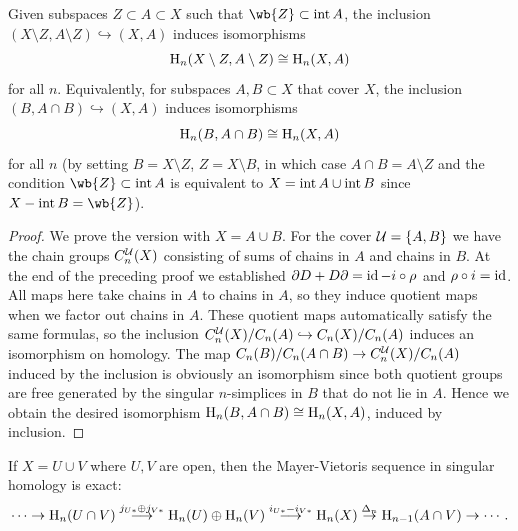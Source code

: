 \begin{thm}\label{thm excision homology}
    Given subspaces $Z\subset A\subset X$ such that $\wb{Z}\subset \Int A$, the inclusion $(X\setminus Z,A\setminus Z)\hookrightarrow (X,A)$ induces isomorphisms 
    \[\mathrm{H}_n(X\setminus Z,A\setminus Z)\cong \mathrm{H}_n(X,A)\]
    for all $n$. Equivalently, for subspaces $A,B\subset X$ that cover $X$, the inclusion $(B,A\cap B)\hookrightarrow (X,A)$ induces isomorphisms
    \[\mathrm{H}_n(B,A\cap B)\cong \mathrm{H}_n(X,A)\]
    for all $n$ (by setting $B=X\setminus Z$, $Z=X\setminus B$, in which case $A\cap B=A\setminus Z$ and the condition $\wb{Z}\subset \Int A$ is equivalent to $X=\operatorname{int} A\cup\operatorname{int} B$ since $X-\Int B=\wb{Z}$).
\end{thm}
\begin{proof}
     We prove the version with $X=A\cup B$. For the cover $\mathcal{U}=\{A,B\}$ we have the chain groups $C_n^{\mathcal{U}}(X)$ consisting of sums of chains in $A$ and chains in $B$. At the end of the preceding proof we established $\partial D+D\partial=\operatorname{id}-i\circ\rho$ and $\rho\circ i=\operatorname{id}$. All maps here take chains in $A$ to chains in $A$, so they induce  quotient maps when we factor out chains in $A$. These quotient maps automatically satisfy the same formulas, so the inclusion $C^{\mathcal{U}}_n(X)/C_n(A)\hookrightarrow C_n(X)/C_n(A)$ induces an isomorphism on homology. The map $C_n(B)/C_n(A\cap B)\to C_n^{\mathcal{U}}(X)/C_n(A)$ induced by the inclusion is obviously an isomorphism since both quotient groups are free generated by the singular $n$-simplices in $B$ that do not lie in $A$. Hence we obtain the desired isomorphism $\mathrm{H}_n(B,A\cap B)\cong \mathrm{H}_n(X,A)$, induced by inclusion.
\end{proof}
\begin{cor}\label{cor MV sequence in singular homology}
    If $X=U\cup V$ where $U,V$ are open, then the Mayer-Vietoris sequence in singular homology is exact:
    \[\cdots \to \mathrm{H}_n(U\cap V)\overset{j_{U\ast}\oplus j_{V\ast}}{\longrightarrow} \mathrm{H}_n(U)\oplus \mathrm{H}_n(V)\overset{i_{U\ast}-i_{V\ast}}{\longrightarrow} \mathrm{H}_n(X)\overset{\Delta_n}{\to} \mathrm{H}_{n-1}(A\cap V)\to \cdots .\]
\end{cor}
